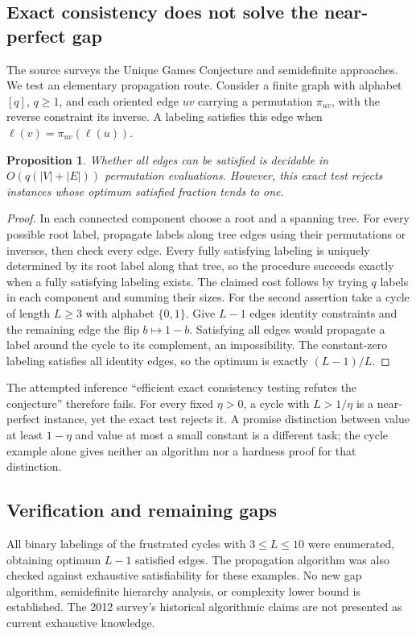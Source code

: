 \documentclass[11pt]{article}
\newtheorem{proposition}{Proposition}
\begin{document}
\subsection{Exact consistency does not solve the near-perfect gap}
The source surveys the Unique Games Conjecture and semidefinite approaches. We test an elementary propagation route. Consider a finite graph with alphabet $[q]$, $q\ge1$, and each oriented edge $uv$ carrying a permutation $\pi_{uv}$, with the reverse constraint its inverse. A labeling satisfies this edge when $\ell(v)=\pi_{uv}(\ell(u))$.
\begin{proposition}
Whether all edges can be satisfied is decidable in $O(q(|V|+|E|))$ permutation evaluations. However, this exact test rejects instances whose optimum satisfied fraction tends to one.
\end{proposition}
\begin{proof}
In each connected component choose a root and a spanning tree. For every possible root label, propagate labels along tree edges using their permutations or inverses, then check every edge. Every fully satisfying labeling is uniquely determined by its root label along that tree, so the procedure succeeds exactly when a fully satisfying labeling exists. The claimed cost follows by trying $q$ labels in each component and summing their sizes.
For the second assertion take a cycle of length $L\ge3$ with alphabet $\{0,1\}$. Give $L-1$ edges identity constraints and the remaining edge the flip $b\mapsto1-b$. Satisfying all edges would propagate a label around the cycle to its complement, an impossibility. The constant-zero labeling satisfies all identity edges, so the optimum is exactly $(L-1)/L$.
\end{proof}
The attempted inference ``efficient exact consistency testing refutes the conjecture'' therefore fails. For every fixed $\eta>0$, a cycle with $L>1/\eta$ is a near-perfect instance, yet the exact test rejects it. A promise distinction between value at least $1-\eta$ and value at most a small constant is a different task; the cycle example alone gives neither an algorithm nor a hardness proof for that distinction.
\subsection{Verification and remaining gaps}
All binary labelings of the frustrated cycles with $3\le L\le10$ were enumerated, obtaining optimum $L-1$ satisfied edges. The propagation algorithm was also checked against exhaustive satisfiability for these examples. No new gap algorithm, semidefinite hierarchy analysis, or complexity lower bound is established. The 2012 survey's historical algorithmic claims are not presented as current exhaustive knowledge.
\end{document}
